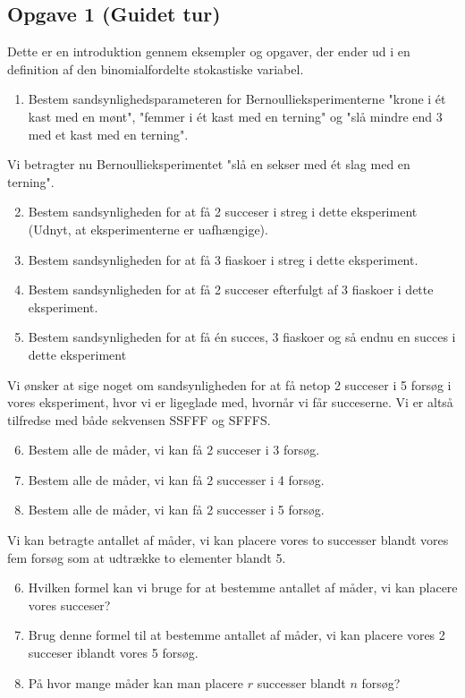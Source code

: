 \subsection*{Opgave 1 (Guidet tur)}
Dette er en introduktion gennem eksempler og opgaver, der ender ud i en definition af den binomialfordelte stokastiske variabel.
\begin{enumerate}[label = \roman*)]
	\item Bestem sandsynlighedsparameteren for Bernoullieksperimenterne "krone i ét kast med en mønt", "femmer i ét kast med en terning" og "slå mindre end 3 med et kast med en 
	terning".
\end{enumerate}
Vi betragter nu Bernoullieksperimentet "slå en sekser med ét slag med en terning". 
\begin{enumerate}[label=\roman*)]
	\setcounter{enumi}{1}
	\item Bestem sandsynligheden for at få 2 succeser i streg i dette eksperiment (Udnyt, at eksperimenterne er uafhængige). 
	\item Bestem sandsynligheden for at få 3 fiaskoer i streg i dette eksperiment.
	\item Bestem sandsynligheden for at få 2 succeser efterfulgt af 3 fiaskoer i dette eksperiment.
	\item Bestem sandsynligheden for at få én succes, 3 fiaskoer og så endnu en succes i dette eksperiment
\end{enumerate}
Vi ønsker at sige noget om sandsynligheden for at få netop 2 succeser i 5 forsøg i vores eksperiment, hvor vi er ligeglade med, hvornår vi får succeserne. Vi er altså tilfredse med både sekvensen SSFFF og SFFFS.
\begin{enumerate}[label=\roman*)]
	\setcounter{enumi}{5}
	\item Bestem alle de måder, vi kan få 2 succeser i 3 forsøg.
	\item Bestem alle de måder, vi kan få 2 successer i 4 forsøg.
	\item Bestem alle de måder, vi kan få 2 successer i 5 forsøg.
\end{enumerate}
Vi kan betragte antallet af måder, vi kan placere vores to successer blandt vores fem forsøg som at udtrække to elementer blandt 5. 
\begin{enumerate}[label=\roman*)]
	\setcounter{enumi}{5}
	\item Hvilken formel kan vi bruge for at bestemme antallet af måder, vi kan placere vores succeser?
	\item Brug denne formel til at bestemme antallet af måder, vi kan placere vores 2 succeser iblandt vores 5 forsøg.
	\item På hvor mange måder kan man placere $r$ successer blandt $n$ forsøg?
\end{enumerate}	
